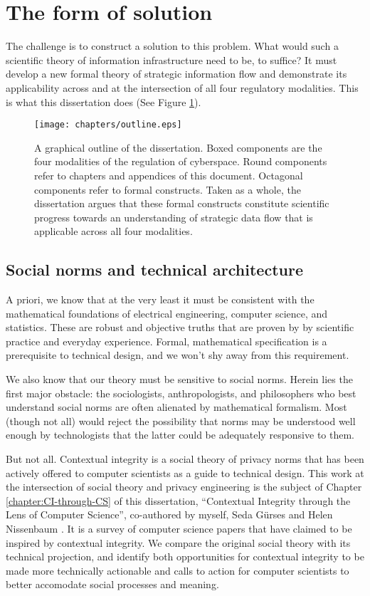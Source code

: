 \documentclass[../thesis.tex]{subfiles}
\begin{document}
 \section{The form of solution}

 The challenge is to construct a solution to this problem.
 What would such a scientific theory of information
 infrastructure need to be, to suffice?
 It must develop a new formal theory of strategic information
 flow and demonstrate its applicability across and
 at the intersection of all four regulatory modalities.
 This is what this dissertation does (See Figure \ref{fig:outline}).

 
 \begin{figure}
   \label{fig:outline}
  \centering
\texttt{[image: chapters/outline.eps]}
\caption[Graphical outline of this dissertation]{
  A graphical outline of the dissertation.
  Boxed components are the four modalities of
  the regulation of cyberspace.
  Round components refer to chapters and appendices
  of this document.
  Octagonal components refer to formal constructs.
  Taken as a whole, the dissertation argues that
  these formal constructs constitute scientific
  progress towards an understanding of strategic
  data flow that is applicable across all four
  modalities.
  }
\end{figure}

 \subsection{Social norms and technical architecture}

 A priori, we know that at the very least it must be
 consistent with the mathematical foundations of
 electrical engineering, computer science, and statistics.
 These are robust and objective truths that are proven
 by by scientific practice and everyday experience.
 Formal, mathematical specification is a prerequisite
 to technical design, and we won't shy away from this
 requirement.

 We also know that our theory must be sensitive to social
 norms.
 Herein lies the first major obstacle: the
 sociologists, anthropologists, and philosophers who best
 understand social norms are often alienated by
 mathematical formalism.
 Most (though not all) would reject the possibility that
 norms may be understood well enough by technologists
 that the latter could be adequately responsive to them.

 But not all.
 Contextual integrity is a social theory of privacy norms
 that has been actively offered to computer scientists
 as a guide to technical design.
 This work at the intersection of social theory and
 privacy engineering is the subject of 
 Chapter \ref{chapter:CI-through-CS} of this
 dissertation, ``Contextual Integrity through the Lens of Computer Science'', co-authored by myself, Seda G{\"u}rses and Helen Nissenbaum \cite{benthall2017contextual}.
 It is a survey of computer science papers that have claimed
 to be inspired by contextual integrity.
 We compare the original social theory with its technical projection, and identify both opportunities for contextual integrity to be made more technically actionable and calls to action for computer scientists to better accomodate social processes and meaning.
\end{document}
